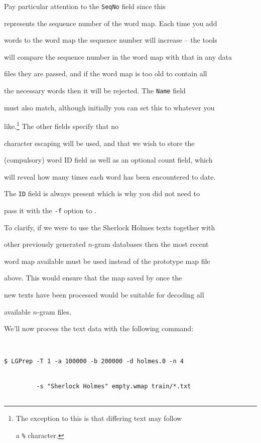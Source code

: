 Pay particular attention to the {\tt SeqNo} field since this


represents the sequence number of the word map.  Each time you add


words to the word map the sequence number will increase -- the tools


will compare the sequence number in the word map with that in any data


files they are passed, and if the word map is too old to contain all


the necessary words then it will be rejected.  The {\tt Name} field


must also match, although initially you can set this to whatever you


like.\footnote{The exception to this is that differing text may follow


a {\tt \%} character.} The other fields specify that no \HTK\


character escaping will be used, and that we wish to store the


(compulsory) word ID field as well as an optional count field, which


will reveal how many times each word has been encountered to date.


The {\tt ID} field is always present which is why you did not need to


pass it with the {\tt -f} option to .





To clarify, if we were to use the Sherlock Holmes texts together with


other previously generated $n$-gram databases then the most recent


word map available must be used instead of the prototype map file


above. This would ensure that the map saved by  once the


new texts have been processed would be suitable for decoding all


available $n$-gram files.





We'll now process the text data with the following command:


\begin{verbatim}


$ LGPrep -T 1 -a 100000 -b 200000 -d holmes.0 -n 4 


         -s "Sherlock Holmes" empty.wmap train/*.txt


\end{verbatim} %





